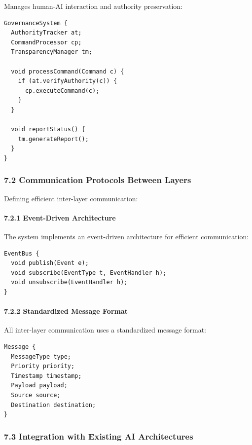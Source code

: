 \documentclass[
]{article}
\begin{document}
Manages human-AI interaction and authority preservation:

\begin{verbatim}
GovernanceSystem {
  AuthorityTracker at;
  CommandProcessor cp;
  TransparencyManager tm;
  
  void processCommand(Command c) {
    if (at.verifyAuthority(c)) {
      cp.executeCommand(c);
    }
  }
  
  void reportStatus() {
    tm.generateReport();
  }
}
\end{verbatim}

\subsubsection{7.2 Communication Protocols Between
Layers}\label{communication-protocols-between-layers}

Defining efficient inter-layer communication:

\paragraph{7.2.1 Event-Driven
Architecture}\label{event-driven-architecture}

The system implements an event-driven architecture for efficient
communication:

\begin{verbatim}
EventBus {
  void publish(Event e);
  void subscribe(EventType t, EventHandler h);
  void unsubscribe(EventHandler h);
}
\end{verbatim}

\paragraph{7.2.2 Standardized Message
Format}\label{standardized-message-format}

All inter-layer communication uses a standardized message format:

\begin{verbatim}
Message {
  MessageType type;
  Priority priority;
  Timestamp timestamp;
  Payload payload;
  Source source;
  Destination destination;
}
\end{verbatim}

\subsubsection{7.3 Integration with Existing AI
Architectures}\label{integration-with-existing-ai-architectures}
\end{document}
